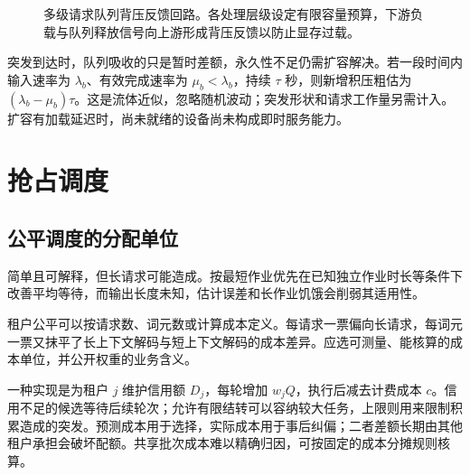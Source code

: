 \documentclass[../textbook.tex]{subfiles}
\begin{document}
\begin{figure}[htbp]
\centering
{}
\caption[多级请求队列背压反馈回路]{多级请求队列背压反馈回路。各处理层级设定有限容量预算，下游负载与队列释放信号向上游形成背压反馈以防止显存过载。}\label{fig:schedule-backpressure}
\end{figure}

突发到达时，队列吸收的只是暂时差额，永久性不足仍需扩容解决。若一段时间内输入速率为 $\lambda_b$、有效完成速率为 $\mu_b<\lambda_b$，持续 $\tau$ 秒，则新增积压粗估为 $(\lambda_b-\mu_b)\tau$。这是流体近似，忽略随机波动；突发形状和请求工作量另需计入。扩容有加载延迟时，尚未就绪的设备尚未构成即时服务能力。

\section{抢占调度}
\optional
\subsection{公平调度的分配单位}
简单且可解释，但长请求可能造成。按最短作业优先在已知独立作业时长等条件下改善平均等待，而输出长度未知，估计误差和长作业饥饿会削弱其适用性。

租户公平可以按请求数、词元数或计算成本定义。每请求一票偏向长请求，每词元一票又抹平了长上下文解码与短上下文解码的成本差异。应选可测量、能核算的成本单位，并公开权重的业务含义。

一种实现是为租户 $j$ 维护信用额 $D_j$，每轮增加 $w_jQ$，执行后减去计费成本 $c$。信用不足的候选等待后续轮次；允许有限结转可以容纳较大任务，上限则用来限制积累造成的突发。预测成本用于选择，实际成本用于事后纠偏；二者差额长期由其他租户承担会破坏配额。共享批次成本难以精确归因，可按固定的成本分摊规则核算。
\end{document}
